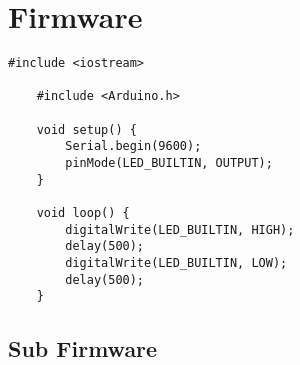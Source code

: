 \newpage

\section{Firmware}\label{04Sec:Firmware}

\begin{lstlisting}[language=Arduino]
    #include <iostream>

    #include <Arduino.h>

    void setup() {
        Serial.begin(9600);
        pinMode(LED_BUILTIN, OUTPUT);
    }
    
    void loop() {
        digitalWrite(LED_BUILTIN, HIGH);
        delay(500);
        digitalWrite(LED_BUILTIN, LOW);
        delay(500);
    }
    \end{lstlisting}


\subsection{Sub Firmware}\label{04Sub:}




